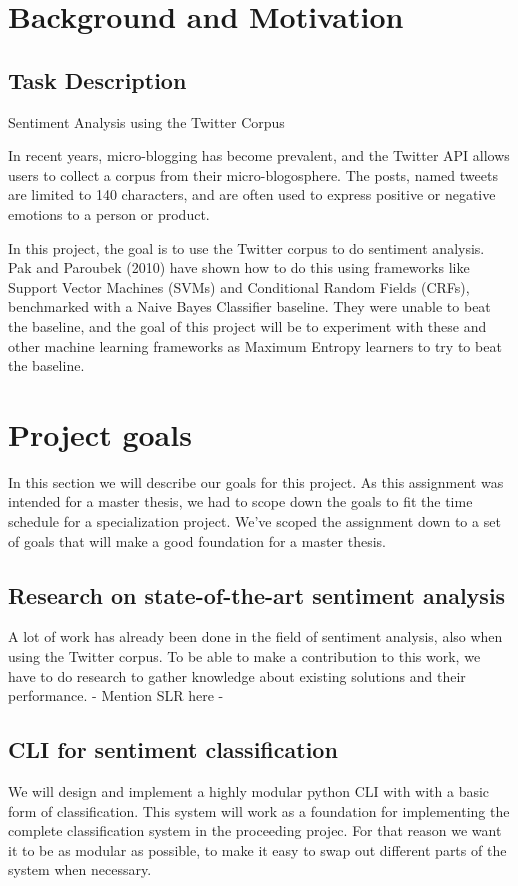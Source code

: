 \section{Background and Motivation}
	\subsection{Task Description}

\begin{center} \Large Sentiment Analysis using the Twitter Corpus \end{center}
\begin{normalsize}
In recent years, micro-blogging has become prevalent, and the Twitter API allows users to collect a corpus from their micro-blogosphere. The posts, named tweets are limited to 140 characters, and are often used to express positive or negative emotions to a person or product.

In this project, the goal is to use the Twitter corpus to do sentiment analysis. Pak and Paroubek (2010) have shown how to do this using frameworks like Support Vector Machines (SVMs) and Conditional Random Fields (CRFs), benchmarked with a Naive Bayes Classifier baseline. They were unable to beat the baseline, and the goal of this project will be to experiment with these and other machine learning frameworks as Maximum Entropy learners to try to beat the baseline.
\end{normalsize}

\section{Project goals}
In this section we will describe our goals for this project. As this assignment was intended for a master thesis, we had to scope down the goals to fit the time schedule for a specialization project. We've scoped the assignment down to a set of goals that will make a good foundation for a master thesis.
	\subsection{Research on state-of-the-art sentiment analysis}
	A lot of work has already been done in the field of sentiment analysis, also when using the Twitter corpus. To be able to make a contribution to this work, we have to do research to gather knowledge about existing solutions and their performance. - Mention SLR here -
	\subsection{CLI for sentiment classification}
	We will design and implement a highly modular python CLI with with a basic form of classification. This system will work as a foundation for implementing the complete classification system in the proceeding projec. For that reason we want it to be as modular as possible, to make it easy to swap out different parts of the system when necessary.
